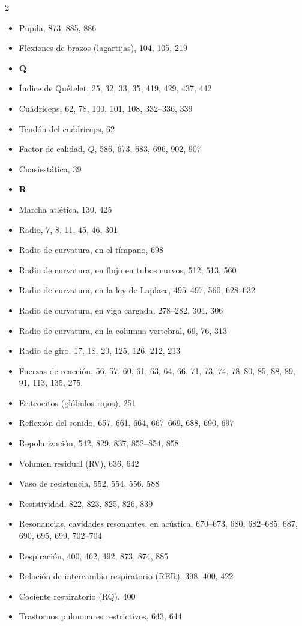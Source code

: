 \documentclass[12pt,a4paper]{book}
\begin{document}
\begin{multicols}{2}
\begin{itemize}[leftmargin=*]
  \item Pupila, 873, 885, 886
  \item Flexiones de brazos (lagartijas), 104, 105, 219
  \item \textbf{Q}
  \item Índice de Quételet, 25, 32, 33, 35, 419, 429, 437, 442
  \item Cuádriceps, 62, 78, 100, 101, 108, 332--336, 339
  \item Tendón del cuádriceps, 62
  \item Factor de calidad, $Q$, 586, 673, 683, 696, 902, 907
  \item Cuasiestática, 39
  \item \textbf{R}
  \item Marcha atlética, 130, 425
  \item Radio, 7, 8, 11, 45, 46, 301
  \item Radio de curvatura, en el tímpano, 698
  \item Radio de curvatura, en flujo en tubos curvos, 512, 513, 560
  \item Radio de curvatura, en la ley de Laplace, 495--497, 560, 628--632
  \item Radio de curvatura, en viga cargada, 278--282, 304, 306
  \item Radio de curvatura, en la columna vertebral, 69, 76, 313
  \item Radio de giro, 17, 18, 20, 125, 126, 212, 213
  \item Fuerzas de reacción, 56, 57, 60, 61, 63, 64, 66, 71, 73, 74, 78--80, 85, 88, 89, 91, 113, 135, 275
  \item Eritrocitos (glóbulos rojos), 251
  \item Reflexión del sonido, 657, 661, 664, 667--669, 688, 690, 697
  \item Repolarización, 542, 829, 837, 852--854, 858
  \item Volumen residual (RV), 636, 642
  \item Vaso de resistencia, 552, 554, 556, 588
  \item Resistividad, 822, 823, 825, 826, 839
  \item Resonancias, cavidades resonantes, en acústica, 670--673, 680, 682--685, 687, 690, 695, 699, 702--704
  \item Respiración, 400, 462, 492, 873, 874, 885
  \item Relación de intercambio respiratorio (RER), 398, 400, 422
  \item Cociente respiratorio (RQ), 400
  \item Trastornos pulmonares restrictivos, 643, 644

\end{itemize}
\end{multicols}
\end{document}
